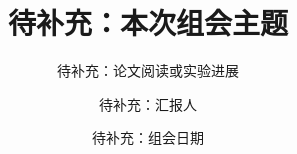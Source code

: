 \title[组会汇报]{待补充：本次组会主题}
\subtitle{待补充：论文阅读或实验进展}
\author{待补充：汇报人}
\date{待补充：组会日期}
\renewcommand{\ReportStatus}{待补充草稿}
